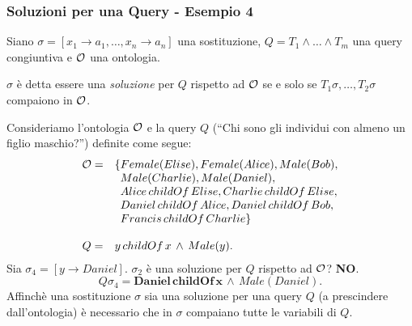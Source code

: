 \documentclass[8pt]{beamer}
\begin{document}
\begin{frame}
\frametitle{Soluzioni per una Query - Esempio 4}
Siano $\sigma=[x_1 \rightarrow a_1, \ldots, x_n \rightarrow a_n]$ una sostituzione,
$Q=T_1 \wedge \ldots \wedge T_m$ una query congiuntiva e $\mathcal{O}$ una ontologia.
\vspace{\baselineskip}

$\sigma$ \`e detta essere una \emph{soluzione} per $Q$ rispetto ad $\mathcal{O}$ se
e solo se $T_1\sigma, \ldots, T_2\sigma$ compaiono in $\mathcal{O}$. 
\vspace{\baselineskip}

Consideriamo l'ontologia $\mathcal{O}$ e la query $Q$ (``Chi sono gli individui con almeno un figlio maschio?'') definite come segue:
\[
\begin{array}{cl}
  \Ont  =  &  \{Female(Elise), Female(Alice), Male(Bob), \\
  &\phantom{\{}Male(Charlie), Male(Daniel), \\
  &\phantom{\{}Alice\,childOf\,Elise, Charlie\,childOf\,Elise, \\
  &\phantom{\{}Daniel\,childOf\,Alice, Daniel\,childOf\,Bob, \\
  &\phantom{\{}Francis\,childOf\,Charlie \}\\
  &\\
  Q = & y\,childOf\,x\,\wedge\,Male(y) .
 \end{array}
\]
Sia $\sigma_4=[y \rightarrow Daniel]$. $\sigma_2$ \`e una soluzione per $Q$
rispetto ad $\mathcal{O}$? \textbf{NO}.
\[
 Q\sigma_4 = \mathbf{Daniel\,childOf\,x}\,\wedge\,Male(Daniel) .
\]
Affinch\`e una sostituzione $\sigma$ sia una soluzione per una query $Q$
(a prescindere dall'ontologia) \`e necessario che in $\sigma$ compaiano
tutte le variabili di $Q$.
\end{frame}
\end{document}
